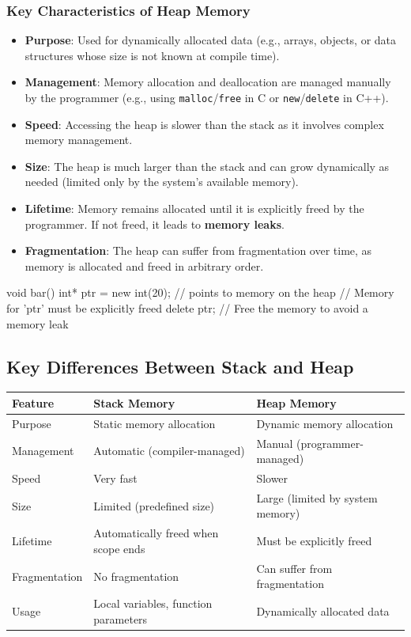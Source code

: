 \subsubsection{Key Characteristics of Heap Memory}
\begin{itemize}
    \item \textbf{Purpose}: Used for dynamically allocated data (e.g., arrays, objects, or data structures whose size is not known at compile time).
    \item \textbf{Management}: Memory allocation and deallocation are managed manually by the programmer (e.g., using \texttt{malloc}/\texttt{free} in C or \texttt{new}/\texttt{delete} in C++).
    \item \textbf{Speed}: Accessing the heap is slower than the stack as it involves complex memory management.
    \item \textbf{Size}: The heap is much larger than the stack and can grow dynamically as needed (limited only by the system's available memory).
    \item \textbf{Lifetime}: Memory remains allocated until it is explicitly freed by the programmer. If not freed, it leads to \textbf{memory leaks}.
    \item \textbf{Fragmentation}: The heap can suffer from fragmentation over time, as memory is allocated and freed in arbitrary order.
\end{itemize}

\begin{exampleblock}
    \begin{codeblock}[language=C++]
void bar() {
    int* ptr = new int(20); // points to memory on the heap
    // Memory for 'ptr' must be explicitly freed
    delete ptr; // Free the memory to avoid a memory leak
}
    \end{codeblock}
\end{exampleblock}

\subsection{Key Differences Between Stack and Heap}

\begin{tabular}{|l|l|l|}
    \hline
    \hfill \textbf{Feature} \hfill & \hfill \textbf{Stack Memory} \hfill & \hfill \textbf{Heap Memory} \hfill \\ \hline
    Purpose & Static memory allocation & Dynamic memory allocation \\ \hline
    Management & Automatic (compiler-managed) & Manual (programmer-managed) \\ \hline
    Speed & Very fast & Slower \\ \hline
    Size & Limited (predefined size) & Large (limited by system memory) \\ \hline
    Lifetime & Automatically freed when scope ends & Must be explicitly freed \\ \hline
    Fragmentation & No fragmentation & Can suffer from fragmentation \\ \hline
    Usage & Local variables, function parameters & Dynamically allocated data \\ \hline
\end{tabular}

